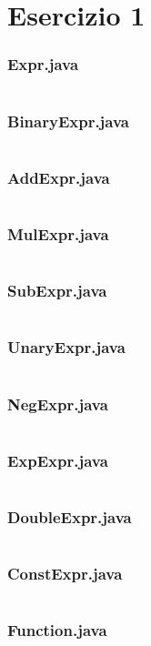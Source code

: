 \section*{Esercizio 1}

\subsubsection*{Expr.java}
\inputminted{java}{tex/src/1/Expr.java}

\subsubsection*{BinaryExpr.java}
\inputminted{java}{tex/src/1/BinaryExpr.java}

\subsubsection*{AddExpr.java}
\inputminted{java}{tex/src/1/AddExpr.java}

\subsubsection*{MulExpr.java}
\inputminted{java}{tex/src/1/MulExpr.java}

\subsubsection*{SubExpr.java}
\inputminted{java}{tex/src/1/SubExpr.java}

\subsubsection*{UnaryExpr.java}
\inputminted{java}{tex/src/1/UnaryExpr.java}

\subsubsection*{NegExpr.java}
\inputminted{java}{tex/src/1/NegExpr.java}

\subsubsection*{ExpExpr.java}
\inputminted{java}{tex/src/1/ExpExpr.java}

\subsubsection*{DoubleExpr.java}
\inputminted{java}{tex/src/1/DoubleExpr.java}

\subsubsection*{ConstExpr.java}
\inputminted{java}{tex/src/1/ConstExpr.java}

\subsubsection*{Function.java}
\inputminted{java}{tex/src/1/Function.java}
